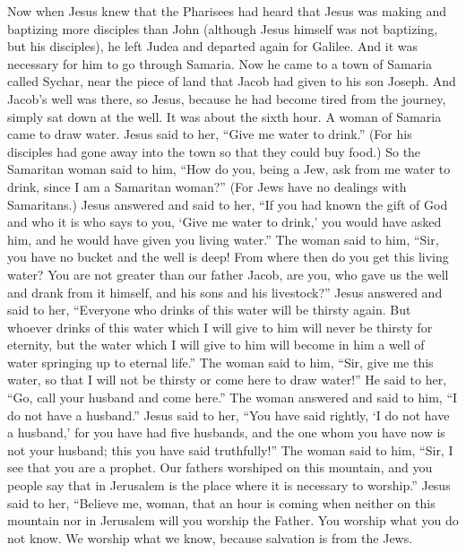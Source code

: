 \begin{biblechapter} %
 Now when Jesus knew that the Pharisees had heard that Jesus was making and baptizing more disciples than John
\verse (although Jesus himself was not baptizing, but his disciples),
\verse he left Judea and departed again for Galilee.
\verse And it was necessary for him to go through Samaria.
\verse Now he came to a town of Samaria called Sychar, near the piece of land that Jacob had given to his son Joseph.
\verse And Jacob’s well was there, so Jesus, because he had become tired from the journey, simply sat down at the well. It was about the sixth hour.
\verse A woman of Samaria came to draw water. Jesus said to her, “Give me water to drink.”
\verse (For his disciples had gone away into the town so that they could buy food.)
\verse So the Samaritan woman said to him, “How do you, being a Jew, ask from me water to drink, since I am a Samaritan woman?” (For Jews have no dealings with Samaritans.)
\verse Jesus answered and said to her, “If you had known the gift of God and who it is who says to you, ‘Give me water to drink,’ you would have asked him, and he would have given you living water.”
\verse The woman said to him, “Sir, you have no bucket and the well is deep! From where then do you get this living water?
\verse You are not greater than our father Jacob, are you, who gave us the well and drank from it himself, and his sons and his livestock?”
\verse Jesus answered and said to her, “Everyone who drinks of this water will be thirsty again.
\verse But whoever drinks of this water which I will give to him will never be thirsty for eternity, but the water which I will give to him will become in him a well of water springing up to eternal life.”
\verse The woman said to him, “Sir, give me this water, so that I will not be thirsty or come here to draw water!”
\verse He said to her, “Go, call your husband and come here.”
\verse The woman answered and said to him, “I do not have a husband.” Jesus said to her, “You have said rightly, ‘I do not have a husband,’
\verse for you have had five husbands, and the one whom you have now is not your husband; this you have said truthfully!”
\verse The woman said to him, “Sir, I see that you are a prophet.
\verse Our fathers worshiped on this mountain, and you people say that in Jerusalem is the place where it is necessary to worship.”
\verse Jesus said to her, “Believe me, woman, that an hour is coming when neither on this mountain nor in Jerusalem will you worship the Father.
\verse You worship what you do not know. We worship what we know, because salvation is from the Jews.

\end{biblechapter}

